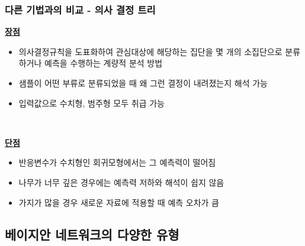 \documentclass{beamer}
\begin{document}
\begin{frame}
\frametitle{다른 기법과의 비교 - \textcolor[rgb]{1.00,0.50,0.25}{의사 결정 트리}}
{\scriptsize{}

	\underline{\textbf{장점}}

	\begin{itemize}

		\item 의사결정규칙을 도표화하여 관심대상에 해당하는 집단을 몇 개의 소집단으로 분류하거나 예측을 수행하는 계량적 분석 방법

		\item 샘플이 어떤 부류로 분류되었을 때 왜 그런 결정이 내려졌는지 해석 가능

		\item 입력값으로 수치형, 범주형 모두 취급 가능
				
	\end{itemize}

	{}\


	\underline{\textbf{단점}}

	\begin{itemize}

		\item 반응변수가 수치형인 회귀모형에서는 그 예측력이 떨어짐
		
		\item 나무가 너무 깊은 경우에는 예측력 저하와 해석이 쉽지 않음
		
		\item 가지가 많을 경우 새로운 자료에 적용할 때 예측 오차가 큼		
		
	\end{itemize}
}
\end{frame}





\subsection{베이지안 네트워크의 다양한 유형}
\end{document}
